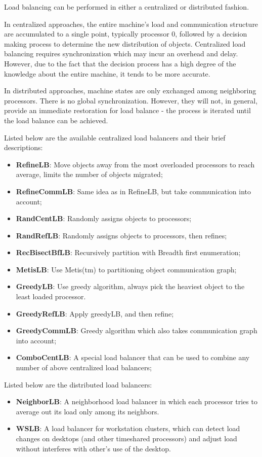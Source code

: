 Load balancing can be performed in either a centralized or distributed
fashion.

In centralized approaches, the entire machine's load and communication
structure are accumulated to a single point, typically processor 0, 
followed by a decision making process to determine the new distribution
of \charmpp objects. Centralized load balancing requires synchronization
which may incur an overhead and delay. However, due to the fact that
the decision process has a high degree of the knowledge about the entire
machine, it tends to be more accurate.

In distributed approaches, machine states are only exchanged among 
neighboring processors. There is no global synchronization. However,
they will not, in general, provide an immediate restoration for load balance -
the process is iterated until the load balance can be achieved.

Listed below are the available centralized load balancers and their brief 
descriptions:
\begin{itemize}
\item {\bf RefineLB}:     Move objects away from the most overloaded processors to reach average, limits the number of objects migrated;
\item {\bf RefineCommLB}:     Same idea as in RefineLB, but take communication into account;
\item {\bf RandCentLB}:   Randomly assigns objects to processors;
\item {\bf RandRefLB}:    Randomly assigns objects to processors, then refines;
\item {\bf RecBisectBfLB}:        Recursively partition with Breadth first enumeration;
\item {\bf MetisLB}:      Use Metis(tm) to partitioning object communication graph;
\item {\bf GreedyLB}:   Use greedy algorithm, always pick the heaviest object to the least loaded processor.
\item {\bf GreedyRefLB}:  Apply greedyLB, and then refine;
\item {\bf GreedyCommLB}:       Greedy algorithm which also takes communication graph into account;
\item {\bf ComboCentLB}:  A special load balancer that can be used to combine any number of above centralized load balancers;
\end{itemize}

Listed below are the distributed load balancers:
\begin{itemize}
\item {\bf NeighborLB}:   A neighborhood load balancer in which each processor tries to average out its load only among its neighbors.
\item {\bf WSLB}:   A load balancer for workstation clusters, which can detect load changes on desktops (and other timeshared processors) and adjust load without interferes with other's use of the desktop.
\end{itemize}

